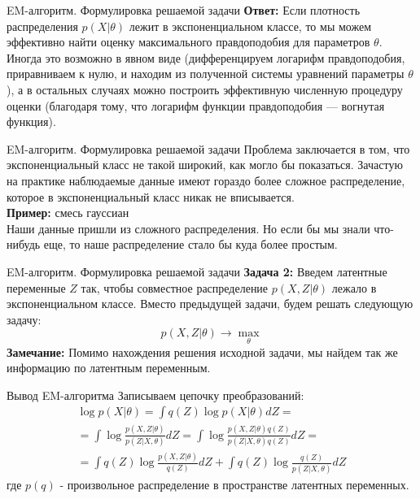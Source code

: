 \documentclass[russian]{vegapresentation}
\begin{document}
    \begin{frame}{EM-алгоритм. Формулировка решаемой задачи}
		\textbf{Ответ:} Если плотность распределения $p(X |\theta)$ лежит в экспоненциальном классе, то мы можем эффективно найти оценку максимального правдоподобия для параметров $\theta$. Иногда это возможно в явном виде (дифференцируем логарифм правдоподобия, приравниваем к нулю, и находим из полученной системы уравнений параметры $\theta$), а в остальных случаях можно построить эффективную численную процедуру оценки (благодаря тому, что логарифм функции правдоподобия — вогнутая функция).
    \end{frame}
    
    \begin{frame}{EM-алгоритм. Формулировка решаемой задачи}
		Проблема заключается в том, что экспоненциальный класс не такой широкий, как могло бы показаться. Зачастую на практике наблюдаемые данные имеют гораздо более сложное распределение, которое в экспоненциальный класс никак не вписывается. \\
		\vspace{3mm}
		\textbf{Пример: } смесь гауссиан \\
		\vspace{3mm}
		Наши данные пришли из сложного распределения. Но если бы мы знали что-нибудь еще, то наше распределение стало бы куда более простым.
    \end{frame}
    
    \begin{frame}{EM-алгоритм. Формулировка решаемой задачи}
		\textbf{Задача 2: } Введем латентные переменные $Z$ так, чтобы совместное распределение $p(X, Z|\theta)$ лежало в экспоненциальном классе. Вместо предыдущей задачи, будем решать следующую задачу:
		\begin{equation}
			p(X,Z|\theta) \rightarrow \max_\theta
		\end{equation}
		\textbf{Замечание: } Помимо нахождения решения исходной задачи, мы найдем так же информацию по латентным переменным. 
    \end{frame}

    \begin{frame}{Вывод EM-алгоритма}
    		Записываем цепочку преобразований:
		\begin{multline}
    			\log p(X|\theta) = \int q(Z) \log p(X|\theta)dZ =\\= \int \log \frac{p(X,Z|\theta)}{p(Z|X,\theta)}dZ =\int \log \frac{p(X,Z|\theta)q(Z)}{p(Z|X,\theta)q(Z)}dZ =\\= \int q(Z) \log \frac{p(X,Z|\theta)}{q(Z)}dZ + \int q(Z) \log \frac{q(Z)}{p(Z|X, \theta)}dZ
		\end{multline}
		где $p(q)$ - произвольное распределение в пространстве латентных переменных.
    \end{frame}
    
\end{document}
